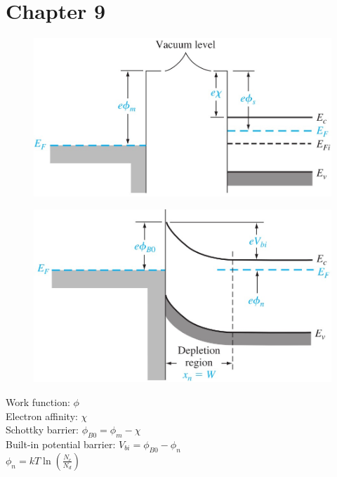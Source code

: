 \documentclass[a4paper, twocolumn]{article}
\begin{document}
\section{Chapter 9}
    \begin{minipage}{\linewidth}
        \begin{minipage}{0.45\linewidth}
            \begin{figure}[H]
                \centering
                \includegraphics[width=\linewidth]{Work-function-graph.jpg}
                \label{fig:Work-function-graph.jpg}
            \end{figure}
        \end{minipage}
        \begin{minipage}{0.45\linewidth}
            \begin{figure}[H]
                \centering
                \includegraphics[width=\linewidth]{Ideal-energy-band-diagram-after-contact.jpg}
                \label{fig:Ideal-energy-band-diagram-after-contact.jpg}
            \end{figure}
        \end{minipage}
    \end{minipage}
    Work function: $\phi$ \\
    Electron affinity: $\chi$\\
    Schottky barrier: $\phi_{B0} = \phi_m - \chi$\\
    Built-in potential barrier: $V_{bi} = \phi_{B0} - \phi _n$\\
    $\phi_n = kT \ln \left( \frac{N_c}{N_d} \right)$\\
    
\end{document}
